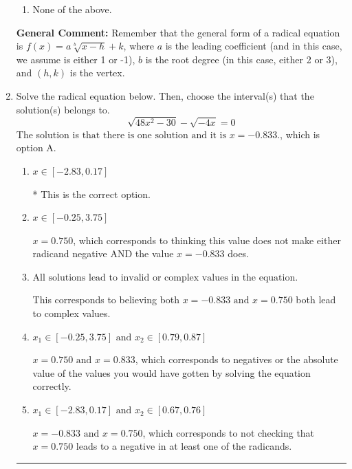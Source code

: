 \documentclass{extbook}[14pt]
\newcommand{\litem}[1]{\item #1

\rule{\textwidth}{0.4pt}}
\begin{document}
\begin{enumerate}
{\begin{enumerate}[label=\Alph*.]
\item None of the above.\end{enumerate}
\textbf{General Comment:} Remember that the general form of a radical equation is $ f(x) = a \sqrt[b]{x - h} + k $, where $a$ is the leading coefficient (and in this case, we assume is either 1 or -1), $b$ is the root degree (in this case, either 2 or 3), and $(h, k)$ is the vertex.
}
\litem{
Solve the radical equation below. Then, choose the interval(s) that the solution(s) belongs to.
\[ \sqrt{48 x^2 - 30} - \sqrt{-4 x} = 0 \]The solution is \( \text{that there is one solution and it is } x = -0.833. \), which is option A.\begin{enumerate}[label=\Alph*.]
\item \( x \in [-2.83,0.17] \)

* This is the correct option.
\item \( x \in [-0.25,3.75] \)

$x = 0.750$, which corresponds to thinking this value does not make either radicand negative AND the value $x = -0.833$ does.
\item \( \text{All solutions lead to invalid or complex values in the equation.} \)

This corresponds to believing both $x = -0.833 \text{ and } x = 0.750$ both lead to complex values.
\item \( x_1 \in [-0.25, 3.75] \text{ and } x_2 \in [0.79,0.87] \)

$x = 0.750 \text{ and } x = 0.833$, which corresponds to negatives or the absolute value of the values you would have gotten by solving the equation correctly.
\item \( x_1 \in [-2.83, 0.17] \text{ and } x_2 \in [0.67,0.76] \)

$x = -0.833 \text{ and } x = 0.750$, which corresponds to not checking that $x = 0.750$ leads to a negative in at least one of the radicands.
\end{enumerate}

}
\end{enumerate}
\end{document}

